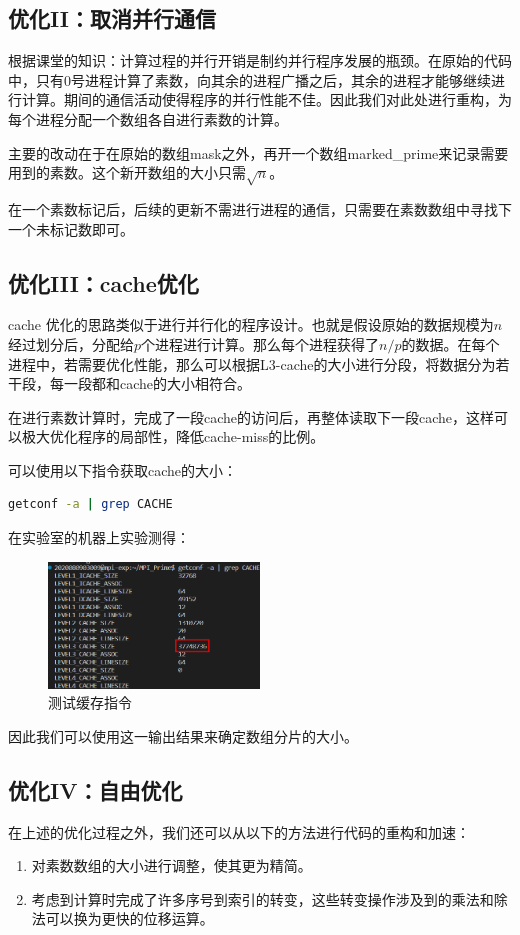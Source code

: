 \documentclass[a4paper,11pt,UTF8]{ctexart}
\begin{document}
\subsection{优化II：取消并行通信}
根据课堂的知识：计算过程的并行开销是制约并行程序发展的瓶颈。在原始的代码中，只有0号进程计算了素数，向其余的进程广播之后，其余的进程才能够继续进行计算。期间的通信活动使得程序的并行性能不佳。因此我们对此处进行重构，为每个进程分配一个数组各自进行素数的计算。

主要的改动在于在原始的数组mask之外，再开一个数组marked\_prime来记录需要用到的素数。这个新开数组的大小只需$\sqrt{n}$。

在一个素数标记后，后续的更新不需进行进程的通信，只需要在素数数组中寻找下一个未标记数即可。

\subsection{优化III：cache优化}

cache 优化的思路类似于进行并行化的程序设计。也就是假设原始的数据规模为$n$经过划分后，分配给$p$个进程进行计算。那么每个进程获得了$n/p$的数据。在每个进程中，若需要优化性能，那么可以根据L3-cache的大小进行分段，将数据分为若干段，每一段都和cache的大小相符合。

在进行素数计算时，完成了一段cache的访问后，再整体读取下一段cache，这样可以极大优化程序的局部性，降低cache-miss的比例。

可以使用以下指令获取cache的大小：
\begin{lstlisting}[language=bash]
  getconf -a | grep CACHE
\end{lstlisting}

在实验室的机器上实验测得：
\newpage
\begin {figure}[h]
\centering %
\includegraphics[width=0.5\textwidth]{5344-041320.png}
\caption{测试缓存指令} %
\label{five}
\end {figure}
因此我们可以使用这一输出结果来确定数组分片的大小。

\subsection{优化IV：自由优化}
在上述的优化过程之外，我们还可以从以下的方法进行代码的重构和加速：
\begin{enumerate}
  \item 对素数数组的大小进行调整，使其更为精简。
  \item 考虑到计算时完成了许多序号到索引的转变，这些转变操作涉及到的乘法和除法可以换为更快的位移运算。
\end{enumerate}
\end{document}
